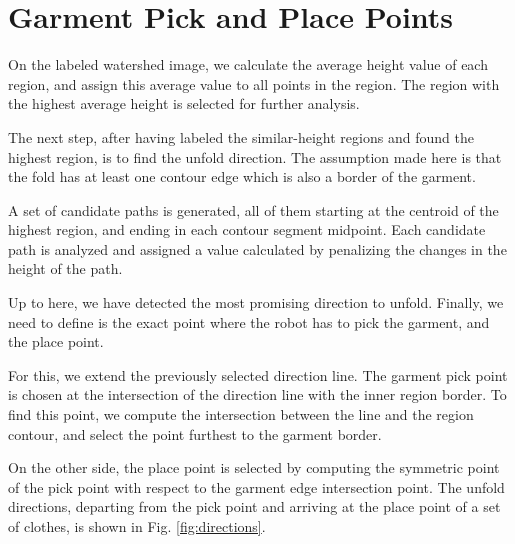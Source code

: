 \section{Garment Pick and Place Points}
On the labeled watershed image, we calculate the average height value of each region, and assign this average value to all points in the region. The region with the highest average height is selected for further analysis. 

The next step, after having labeled the similar-height regions and found the highest region, is to find the unfold direction. The assumption made here is that the fold has at least one contour edge which is also a border of the garment. 

A set of candidate paths is generated, all of them starting at the centroid of the highest region, and ending in each contour segment midpoint. Each candidate path is analyzed and assigned a value calculated by penalizing the changes in the height of the path.

Up to here, we have detected the most promising direction to unfold. Finally, we need to define is the exact point where the robot has to pick the garment, and the place point. 

For this, we extend the previously selected direction line. The garment pick point is chosen at the intersection of the direction line with the inner region border. To find this point, we compute the intersection between the line and the region contour, and select the point furthest to the garment border.

On the other side, the place point is selected by computing the symmetric point of the pick point with respect to the garment edge intersection point. The unfold directions, departing from the pick point and arriving at the place point of a set of clothes, is shown in Fig. \ref{fig:directions}.
